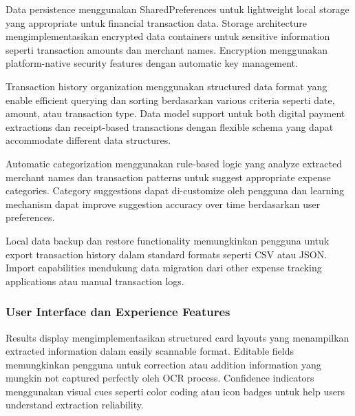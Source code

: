 Data persistence menggunakan SharedPreferences untuk lightweight local storage yang appropriate untuk financial transaction data. Storage architecture mengimplementasikan encrypted data containers untuk sensitive information seperti transaction amounts dan merchant names. Encryption menggunakan platform-native security features dengan automatic key management.


Transaction history organization menggunakan structured data format yang enable efficient querying dan sorting berdasarkan various criteria seperti date, amount, atau transaction type. Data model support untuk both digital payment extractions dan receipt-based transactions dengan flexible schema yang dapat accommodate different data structures.

Automatic categorization menggunakan rule-based logic yang analyze extracted merchant names dan transaction patterns untuk suggest appropriate expense categories. Category suggestions dapat di-customize oleh pengguna dan learning mechanism dapat improve suggestion accuracy over time berdasarkan user preferences.

Local data backup dan restore functionality memungkinkan pengguna untuk export transaction history dalam standard formats seperti CSV atau JSON. Import capabilities mendukung data migration dari other expense tracking applications atau manual transaction logs.

\subsubsection{User Interface dan Experience Features}
\label{subsubsec:ui-ux-features}

Results display mengimplementasikan structured card layouts yang menampilkan extracted information dalam easily scannable format. Editable fields memungkinkan pengguna untuk correction atau addition information yang mungkin not captured perfectly oleh OCR process. Confidence indicators menggunakan visual cues seperti color coding atau icon badges untuk help users understand extraction reliability.

